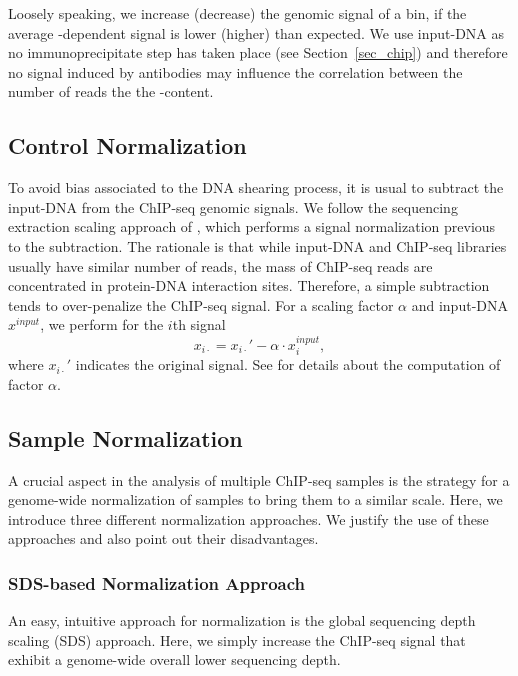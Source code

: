 \noindent
Loosely speaking, we increase (decrease) the genomic signal of a bin, if the average -dependent signal is lower (higher) than expected.
We use input-DNA as no immunoprecipitate step has taken place (see Section~\ref{sec_chip}) and therefore no signal induced by antibodies may influence the correlation between the number of reads the the -content.

\subsection{Control Normalization}
\label{sec_method_control_norm}
To avoid bias associated to the DNA shearing process, it is usual to subtract the input-DNA from the ChIP-seq genomic signals. 
We follow the sequencing extraction scaling approach of \cite{diaz2012}, which performs a signal normalization previous to the subtraction. 
The rationale is that while input-DNA and ChIP-seq libraries usually have similar number of reads, the mass of ChIP-seq reads are concentrated in protein-DNA interaction sites. Therefore, a simple subtraction tends to over-penalize the ChIP-seq signal.
For a scaling factor $\alpha$ and input-DNA $x^{input}$, we perform for the $i$th signal
$$x_{i\cdot} = x_{i\cdot}' - \alpha \cdot x^{input}_i,$$
\noindent
where $x_{i\cdot}'$ indicates the original signal.
See \cite{diaz2012} for details about the computation of factor $\alpha$.


\subsection{Sample Normalization}
\label{sec_sample_norm}
A crucial aspect in the analysis of multiple ChIP-seq samples is the strategy for a genome-wide normalization of samples to bring them to a similar scale. 
Here, we introduce three different normalization approaches.
We justify the use of these approaches and also point out their disadvantages.

\subsubsection{SDS-based Normalization Approach}
An easy, intuitive approach for normalization is the global sequencing depth scaling (SDS) approach.
Here, we simply increase the ChIP-seq signal that exhibit a genome-wide overall lower sequencing depth.

